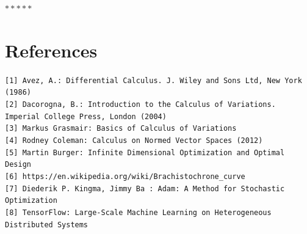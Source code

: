 \documentclass[12 pt]{article}
\theoremstyle{definition}
\theoremstyle{remark}
\begin{document}
\begin{center}
    $*****$
\end{center}










\newpage
\section{References}
\texttt{[1] Avez, A.: Differential Calculus. J. Wiley and Sons Ltd, New York (1986)}\\
\texttt{[2] Dacorogna, B.: Introduction to the Calculus of Variations. Imperial College Press, London (2004)}\\
\texttt{[3] Markus Grasmair: Basics of Calculus of Variations}\\
\texttt{[4] Rodney Coleman: Calculus on Normed Vector Spaces (2012)} \\
\texttt{[5] Martin Burger: Infinite Dimensional Optimization and Optimal Design}\\
\texttt{[6] https://en.wikipedia.org/wiki/Brachistochrone\_curve}\\
\texttt{[7] Diederik P. Kingma, Jimmy Ba : Adam: A Method for Stochastic Optimization}\\
\texttt{[8] TensorFlow:
Large-Scale Machine Learning on Heterogeneous Distributed Systems}
\end{document}
